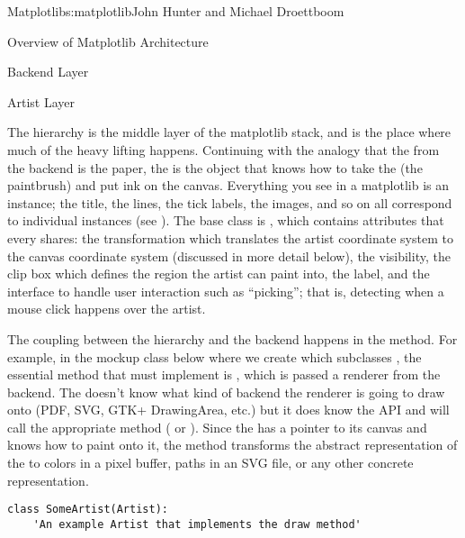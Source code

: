 \begin{aosachapter}{Matplotlib}{s:matplotlib}{John Hunter and Michael Droettboom}
\begin{aosasect1}{Overview of Matplotlib Architecture}
\begin{aosasect2}{Backend Layer}
\end{aosasect2}

\begin{aosasect2}{Artist Layer}

The  hierarchy is the middle layer of the matplotlib
stack, and is the place where much of the heavy lifting happens.
Continuing with the analogy that the  from the
backend is the paper, the  is the object that knows how
to take the  (the paintbrush) and put ink on the
canvas.  Everything you see in a matplotlib  is an
 instance; the title, the lines, the tick labels, the
images, and so on all correspond to individual  instances
(see ).  The base class is
, which contains attributes that every
 shares: the transformation which translates the artist
coordinate system to the canvas coordinate system (discussed in more
detail below), the visibility, the clip box which defines the region
the artist can paint into, the label, and the interface to handle user
interaction such as ``picking''; that is, detecting when a mouse click
happens over the artist.



The coupling between the  hierarchy and the backend
happens in the  method.  For example, in the mockup class below
where we create  which subclasses , the
essential method that  must implement is ,
which is passed a renderer from the backend.
The  doesn't know what kind of backend the renderer is going to
draw onto (PDF, SVG, GTK+ DrawingArea, etc.) but it does know the
 API and will call the appropriate method
( or ).  Since the  has
a pointer to its canvas and knows how to paint onto it, the 
method transforms the abstract representation of the  to
colors in a pixel buffer, paths in an SVG file, or any other
concrete representation.

\begin{verbatim}
class SomeArtist(Artist):
    'An example Artist that implements the draw method'


\end{verbatim}
\end{aosasect2}
\end{aosasect1}
\end{aosachapter}
